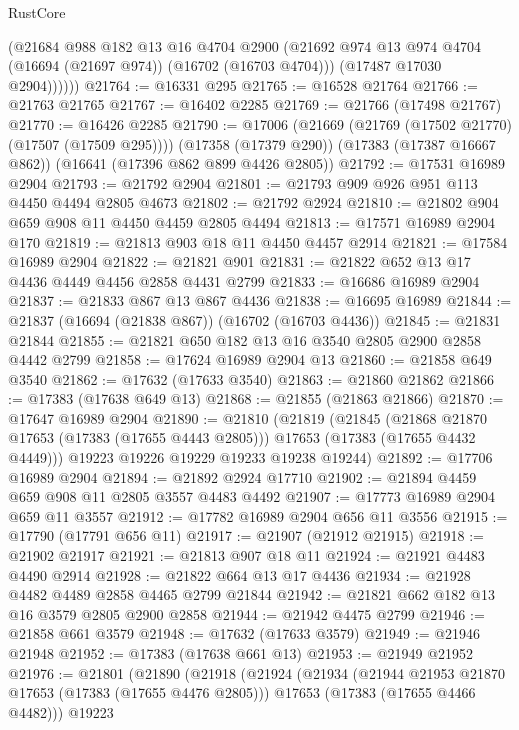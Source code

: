 \begin{lexlean}{RustCore}
\begin{coremodule}
            (@21684
              @988
              @182
              @13
              @16
              @4704
              @2900
              (@21692 @974 @13 @974 @4704 (@16694 (@21697 @974)) (@16702 (@16703 @4704)))
              (@17487 @17030 @2904))))))
@21764 := @16331 @295
@21765 := @16528 @21764
@21766 := @21763 @21765
@21767 := @16402 @2285
@21769 := @21766 (@17498 @21767)
@21770 := @16426 @2285
@21790 := @17006
    (@21669 (@21769 (@17502 @21770) (@17507 (@17509 @295))))
    (@17358 (@17379 @290))
    (@17383 (@17387 @16667 @862))
    (@16641 (@17396 @862 @899 @4426 @2805))
@21792 := @17531 @16989 @2904
@21793 := @21792 @2904
@21801 := @21793 @909 @926 @951 @113 @4450 @4494 @2805 @4673
@21802 := @21792 @2924
@21810 := @21802 @904 @659 @908 @11 @4450 @4459 @2805 @4494
@21813 := @17571 @16989 @2904 @170
@21819 := @21813 @903 @18 @11 @4450 @4457 @2914
@21821 := @17584 @16989 @2904
@21822 := @21821 @901
@21831 := @21822 @652 @13 @17 @4436 @4449 @4456 @2858 @4431 @2799
@21833 := @16686 @16989 @2904
@21837 := @21833 @867 @13 @867 @4436
@21838 := @16695 @16989
@21844 := @21837 (@16694 (@21838 @867)) (@16702 (@16703 @4436))
@21845 := @21831 @21844
@21855 := @21821 @650 @182 @13 @16 @3540 @2805 @2900 @2858 @4442 @2799
@21858 := @17624 @16989 @2904 @13
@21860 := @21858 @649 @3540
@21862 := @17632 (@17633 @3540)
@21863 := @21860 @21862
@21866 := @17383 (@17638 @649 @13)
@21868 := @21855 (@21863 @21866)
@21870 := @17647 @16989 @2904
@21890 := @21810
    (@21819
      (@21845
        (@21868 @21870 @17653 (@17383 (@17655 @4443 @2805)))
        @17653
        (@17383 (@17655 @4432 @4449)))
      @19223
      @19226
      @19229
      @19233
      @19238
      @19244)
@21892 := @17706 @16989 @2904
@21894 := @21892 @2924 @17710
@21902 := @21894 @4459 @659 @908 @11 @2805 @3557 @4483 @4492
@21907 := @17773 @16989 @2904 @659 @11 @3557
@21912 := @17782 @16989 @2904 @656 @11 @3556
@21915 := @17790 (@17791 @656 @11)
@21917 := @21907 (@21912 @21915)
@21918 := @21902 @21917
@21921 := @21813 @907 @18 @11
@21924 := @21921 @4483 @4490 @2914
@21928 := @21822 @664 @13 @17 @4436
@21934 := @21928 @4482 @4489 @2858 @4465 @2799 @21844
@21942 := @21821 @662 @182 @13 @16 @3579 @2805 @2900 @2858
@21944 := @21942 @4475 @2799
@21946 := @21858 @661 @3579
@21948 := @17632 (@17633 @3579)
@21949 := @21946 @21948
@21952 := @17383 (@17638 @661 @13)
@21953 := @21949 @21952
@21976 := @21801
    (@21890
      (@21918
        (@21924
          (@21934
            (@21944 @21953 @21870 @17653 (@17383 (@17655 @4476 @2805)))
            @17653
            (@17383 (@17655 @4466 @4482)))
          @19223

\end{coremodule}
\end{lexlean}
